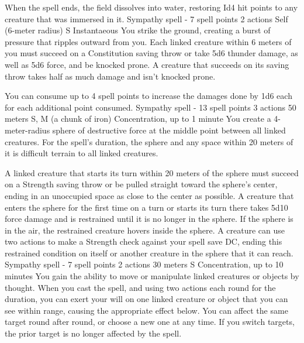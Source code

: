     When the spell ends, the field dissolves into water, restoring Id4 hit points to any creature that was immersed in it.
    {Sympathy spell - 7 spell points}
    {2 actions}
    {Self (6-meter radius)}
    {S}
    {Instantaeous}
    You strike the ground, creating a burst of pressure that ripples outward from you.
    Each linked creature within 6 meters of you must succeed on a Constitution saving throw or take 5d6 thunder damage, as well as 5d6 force, and be knocked prone.
    A creature that succeeds on its saving throw takes half as much damage and isn't knocked prone.

    You can consume up to 4 spell points to increase the damages done by 1d6 each for each additional point consumed.
    {Sympathy spell - 13 spell points}
    {3 actions}
    {50 meters}
    {S, M (a chunk of iron)}
    {Concentration, up to 1 minute}
    You create a 4-meter-radius sphere of destructive force at the middle point between all linked creatures.
    For the spell's duration, the sphere and any space within 20 meters of it is difficult terrain to all linked creatures.

    A linked creature that starts its turn within 20 meters of the sphere must succeed on a Strength saving throw or be pulled straight toward the sphere's center, ending in an unoccupied space as close to the center as possible.
    A creature that enters the sphere for the first time on a turn or starts its turn there takes 5d10 force damage and is restrained until it is no longer in the sphere.
    If the sphere is in the air, the restrained creature hovers inside the sphere.
    A creature can use two actions to make a Strength check against your spell save DC, ending this restrained condition on itself or another creature in the sphere that it can reach.
    {Sympathy spell - 7 spell points}
    {2 actions}
    {30 meters}
    {S}
    {Concentration, up to 10 minutes}
    You gain the ability to move or manipulate linked creatures or objects by thought.
    When you cast the spell, and using two actions each round for the duration, you can exert your will on one linked creature or object that you can see within range, causing the appropriate effect below.
    You can affect the same target round after round, or choose a new one at any time.
    If you switch targets, the prior target is no longer affected by the spell.

